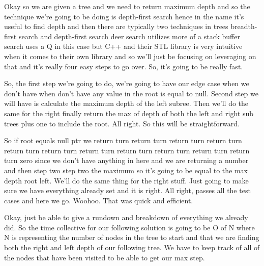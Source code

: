 \expandafter\def\csname sourceexcerpt@34\endcsname{%
Okay so we are given a tree and we need to return maximum depth and so the technique
we're going to be doing is depth-first search hence in the name it's useful to find depth
and then there are typically two techniques in trees breadth-first search and depth-first search
deer search utilizes more of a stack buffer search uses a Q in this case but C++ and
their STL library is very intuitive when it comes to their own library and so we'll
just be focusing on leveraging on that and it's really four easy steps to go over. So,
it's going to be really fast.

So, the first step we're going to do, we're going to have our edge case when we don't
have when don't have any value in the root is equal to null. Second step we will have
is calculate the maximum depth of the left subree. Then we'll do the same for the
right finally return the max of depth of both the left and right sub trees plus one to
include the root. All right. So this will be straightforward.

So if root equals null ptr we return turn return turn return turn return turn return
turn return turn return turn return turn return turn return turn return turn zero
since we don't have anything in here and we are returning a number and then step two
step two the maximum so it's going to be equal to the max depth root left. We'll do
the same thing for the right stuff. Just going to make sure we have everything already
set and it is right. All right, passes all the test cases and here we go. Woohoo. That
was quick and efficient.

Okay, just be able to give a rundown and breakdown of everything we already did. So
the time collective for our following solution is going to be O of N where N is
representing the number of nodes in the tree to start and that we are finding both the
right and left depth of our following tree. We have to keep track of all of the nodes
that have been visited to be able to get our max step.
}

